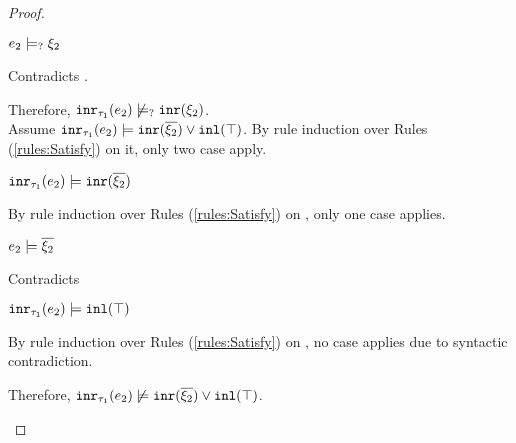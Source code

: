 \begin{proof}
\begin{byCases}
\begin{byCases}
\begin{byCases}
\begin{byCases}
\begin{pfsteps*}
                \item $e_2 \models_{?} \xi_2$
                \end{pfsteps*}
                Contradicts .
            \end{byCases}
            Therefore, $\mathtt{inr}_{\tau_1}({e_2}) \not\models_{?} \mathtt{inr}(\xi_2)$.\\
            Assume $\mathtt{inr}_{\tau_1}({e_2}) \models \mathtt{inr}(\overline{\xi_2}) \vee \mathtt{inl}(\top)$. By rule induction over Rules (\ref{rules:Satisfy}) on it, only two case apply.
            \begin{byCases}
            \item[\text{(\ref{rule:CMSOr1})}]
                \begin{pfsteps*}
                \item $\mathtt{inr}_{\tau_1}({e_2}) \models \mathtt{inr}(\overline{\xi_2})$  
                \end{pfsteps*}
                By rule induction over Rules (\ref{rules:Satisfy}) on , only one case applies.
                \begin{byCases}
                \item[\text{(\ref{rule:CSInr})}]
                    \begin{pfsteps*}
                    \item $e_2 \models \overline{\xi_2}$ 
                    \end{pfsteps*}
                    Contradicts 
                \end{byCases}
            \item[\text{(\ref{rule:CMSOr2})}]
                \begin{pfsteps*}
                \item $\mathtt{inr}_{\tau_1}({e_2}) \models \mathtt{inl}(\top)$  
                \end{pfsteps*}
                By rule induction over Rules (\ref{rules:Satisfy}) on , no case applies due to syntactic contradiction.
            \end{byCases}
            Therefore, $\mathtt{inr}_{\tau_1}({e_2}) \not\models \mathtt{inr}(\overline{\xi_2}) \vee \mathtt{inl}(\top)$.
        \item[\cmaysatisfy{e_2}{\xi_2}]
            \begin{pfsteps*}

\end{pfsteps*}
\end{byCases}
\end{byCases}
\end{byCases}
\end{proof}
